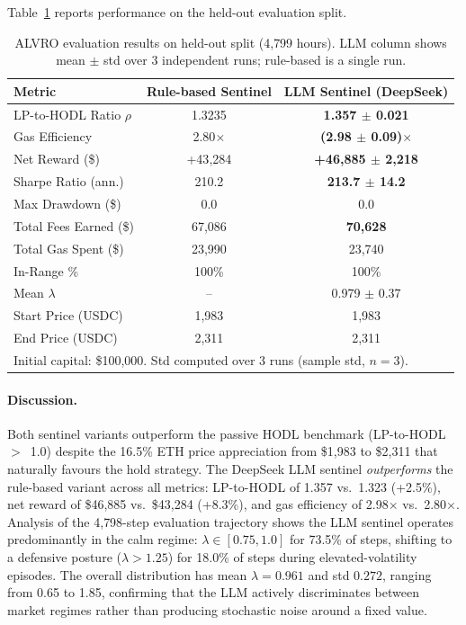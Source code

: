 \documentclass{article}
\begin{document}
Table~\ref{tab:results} reports performance on the held-out evaluation split.

\begin{table}[h]
\centering
\caption{ALVRO evaluation results on held-out split (4{,}799 hours).
         LLM column shows mean $\pm$ std over 3 independent runs; rule-based is a single run.}
\label{tab:results}
\begin{tabular}{lcc}
\toprule
Metric & Rule-based Sentinel & LLM Sentinel (DeepSeek) \\
\midrule
LP-to-HODL Ratio $\rho$ & 1.3235 & \textbf{1.357 $\pm$ 0.021} \\
Gas Efficiency & 2.80$\times$ & \textbf{(2.98 $\pm$ 0.09)$\times$} \\
Net Reward (\$) & +43{,}284 & \textbf{+46{,}885 $\pm$ 2{,}218} \\
Sharpe Ratio (ann.) & 210.2 & \textbf{213.7 $\pm$ 14.2} \\
Max Drawdown (\$) & 0.0 & 0.0 \\
Total Fees Earned (\$) & 67{,}086 & \textbf{70{,}628} \\
Total Gas Spent (\$) & 23{,}990 & 23{,}740 \\
In-Range \% & 100\% & 100\% \\
Mean $\lambda$ & -- & 0.979 $\pm$ 0.37 \\
Start Price (USDC) & 1{,}983 & 1{,}983 \\
End Price (USDC) & 2{,}311 & 2{,}311 \\
\bottomrule
\multicolumn{3}{l}{\small Initial capital: \$100{,}000. Std computed over 3 runs (sample std, $n=3$).}
\end{tabular}
\end{table}

\paragraph{Discussion.}
Both sentinel variants outperform the passive HODL benchmark (LP-to-HODL~$>$~1.0)
despite the 16.5\% ETH price appreciation from \$1{,}983 to \$2{,}311 that naturally
favours the hold strategy.  The DeepSeek LLM sentinel \emph{outperforms} the
rule-based variant across all metrics: LP-to-HODL of 1.357 vs.\ 1.323 (+2.5\%),
net reward of \$46{,}885 vs.\ \$43{,}284 (+8.3\%), and gas efficiency of
2.98$\times$ vs.\ 2.80$\times$.  Analysis of the 4{,}798-step evaluation trajectory shows the LLM sentinel
operates predominantly in the calm regime: $\lambda \in [0.75, 1.0]$ for
73.5\% of steps, shifting to a defensive posture ($\lambda > 1.25$) for
18.0\% of steps during elevated-volatility episodes.  The overall distribution
has mean $\lambda = 0.961$ and std $0.272$, ranging from 0.65 to 1.85,
confirming that the LLM actively discriminates between market regimes rather
than producing stochastic noise around a fixed value.
\end{document}
